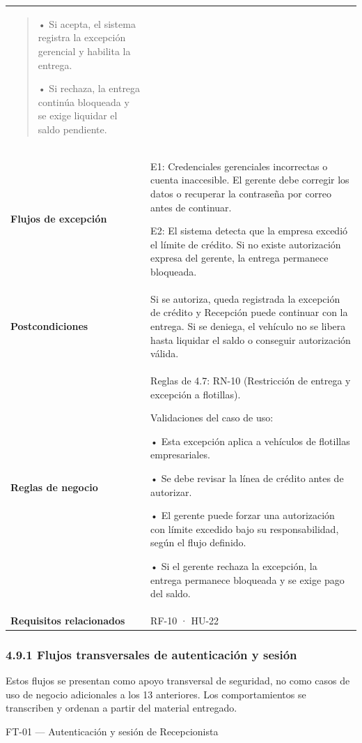 {\begin{longtable}[]{@{}
  >{\raggedright\arraybackslash}p{}
  >{\raggedright\arraybackslash}p{}@{}}
\begin{minipage}[t]{\linewidth}
\begin{quote}
• Si acepta, el sistema registra la excepción gerencial y habilita la
entrega.

• Si rechaza, la entrega continúa bloqueada y se exige liquidar el saldo
pendiente.
\end{quote}
\end{minipage} \\
\textbf{Flujos de excepción} & E1: Credenciales gerenciales incorrectas
o cuenta inaccesible. El gerente debe corregir los datos o recuperar la
contraseña por correo antes de continuar.

E2: El sistema detecta que la empresa excedió el límite de crédito. Si
no existe autorización expresa del gerente, la entrega permanece
bloqueada. \\
\textbf{Postcondiciones} & Si se autoriza, queda registrada la excepción
de crédito y Recepción puede continuar con la entrega. Si se deniega, el
vehículo no se libera hasta liquidar el saldo o conseguir autorización
válida. \\
\textbf{Reglas de negocio} & Reglas de 4.7: RN-10 (Restricción de
entrega y excepción a flotillas).

Validaciones del caso de uso:

• Esta excepción aplica a vehículos de flotillas empresariales.

• Se debe revisar la línea de crédito antes de autorizar.

• El gerente puede forzar una autorización con límite excedido bajo su
responsabilidad, según el flujo definido.

• Si el gerente rechaza la excepción, la entrega permanece bloqueada y
se exige pago del saldo. \\
\textbf{Requisitos relacionados} & RF-10 · HU-22 \\
\end{longtable}
}

\subsubsection{4.9.1 Flujos transversales de autenticación y
sesión}\label{flujos-transversales-de-autenticaciuxf3n-y-sesiuxf3n}

Estos flujos se presentan como apoyo transversal de seguridad, no como
casos de uso de negocio adicionales a los 13 anteriores. Los
comportamientos se transcriben y ordenan a partir del material
entregado.

FT-01 --- Autenticación y sesión de Recepcionista

